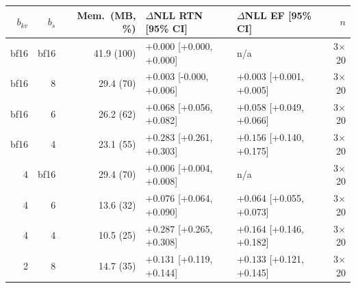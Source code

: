 \begin{tabular}{rrrllr}
\toprule
$b_{kv}$ & $b_s$ & Mem.\ (MB, \%) & $\Delta$NLL RTN [95\% CI] & $\Delta$NLL EF [95\% CI] & $n$ \\
\midrule
bf16 & bf16 & 41.9 (100) & $+0.000$ [+0.000, +0.000] & n/a & 3$\times$20 \\
bf16 & 8 & 29.4 (70) & $+0.003$ [-0.000, +0.006] & $+0.003$ [+0.001, +0.005] & 3$\times$20 \\
bf16 & 6 & 26.2 (62) & $+0.068$ [+0.056, +0.082] & $+0.058$ [+0.049, +0.066] & 3$\times$20 \\
bf16 & 4 & 23.1 (55) & $+0.283$ [+0.261, +0.303] & $+0.156$ [+0.140, +0.175] & 3$\times$20 \\
4 & bf16 & 29.4 (70) & $+0.006$ [+0.004, +0.008] & n/a & 3$\times$20 \\
4 & 6 & 13.6 (32) & $+0.076$ [+0.064, +0.090] & $+0.064$ [+0.055, +0.073] & 3$\times$20 \\
4 & 4 & 10.5 (25) & $+0.287$ [+0.265, +0.308] & $+0.164$ [+0.146, +0.182] & 3$\times$20 \\
2 & 8 & 14.7 (35) & $+0.131$ [+0.119, +0.144] & $+0.133$ [+0.121, +0.145] & 3$\times$20 \\
\bottomrule
\end{tabular}
